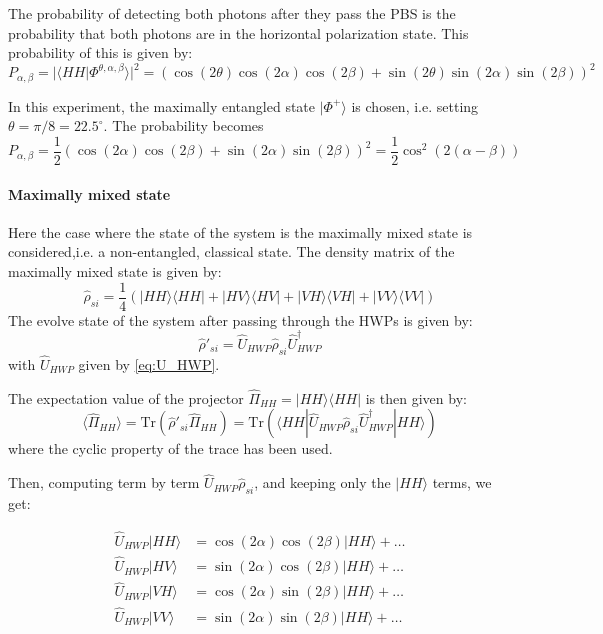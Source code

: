 \documentclass[a4paper, 12pt,oneside]{article}
\begin{document}
The probability of detecting both photons after they pass the PBS is the probability that both photons are in the horizontal polarization state. This probability of this is given by:
\begin{equation}
    P_{\alpha,\beta} = |\langle HH | \Phi^{\theta, \alpha, \beta}\rangle|^2 = (\cos(2\theta) \cos(2\alpha) \cos(2\beta) + \sin(2\theta) \sin(2\alpha) \sin(2\beta))^2 
\end{equation}

In this experiment, the maximally entangled state $|\Phi^+\rangle$ is chosen, i.e. setting $\theta = \pi/8 = 22.5^\circ$. The probability becomes
\begin{equation}
    P_{\alpha,\beta} = \frac{1}{2}(\cos(2\alpha) \cos(2\beta) + \sin(2\alpha) \sin(2\beta))^2 = \frac{1}{2} \cos^2(2(\alpha - \beta)) 
    \label{eq:P}
\end{equation}

\paragraph{Maximally mixed state}
Here the case where the state of the system is the maximally mixed state is considered,i.e. a non-entangled, classical state. The density matrix of the maximally mixed state is given by:
\begin{equation}
    \hat{\rho}_{si} = \frac{1}{4} \left( |HH\rangle \langle HH| + |HV\rangle \langle HV| + |VH\rangle \langle VH| + |VV\rangle \langle VV| \right)
\end{equation}
The evolve state of the system after passing through the HWPs is given by:
\begin{equation}
    \hat{\rho}'_{si} = \hat{U}_{HWP} \hat{\rho}_{si} \hat{U}_{HWP}^\dagger
\end{equation}
with $\hat{U}_{HWP}$ given by \eqref{eq:U_HWP}. 

The expectation value of the projector $\hat{\Pi}_{HH} = |HH\rangle \langle HH|$ is then given by:
\begin{equation}
    \langle \hat{\Pi}_{HH} \rangle = \text{Tr}(\hat{\rho}'_{si} \hat{\Pi}_{HH}) = \text{Tr}(\langle HH|\hat{U}_{HWP} \hat{\rho}_{si} \hat{U}_{HWP}^\dagger |HH\rangle)
\end{equation}
where the cyclic property of the trace has been used.

Then, computing term by term $ \hat{U}_{HWP} \hat{\rho}_{si}$, and keeping only the $|HH\rangle$ terms, we get:

\begin{equation}
\begin{aligned}
    \hat{U}_{HWP} |HH\rangle &= \cos(2\alpha)\cos(2\beta) |HH\rangle + \hdots \\
    \hat{U}_{HWP} |HV\rangle &=  \sin(2\alpha)\cos(2\beta) |HH\rangle + \hdots \\
    \hat{U}_{HWP} |VH\rangle &= \cos(2\alpha)\sin(2\beta) |HH\rangle + \hdots \\
    \hat{U}_{HWP} |VV\rangle &= \sin(2\alpha)\sin(2\beta) |HH\rangle+ \hdots 
\end{aligned}
\end{equation}
\end{document}
